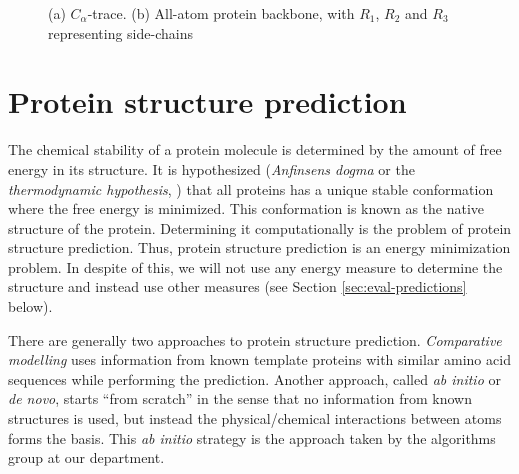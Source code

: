 

\begin{figure}
  \centering
  \caption{(a) $C_{\alpha}$-trace. (b) All-atom protein backbone, with $R_1$, $R_2$ and $R_3$ representing side-chains}
\end{figure}

\section{Protein structure prediction}
The chemical stability of a protein molecule is determined by the
amount of free energy in its structure. It is hypothesized
(\textit{Anfinsens dogma} or the \textit{thermodynamic hypothesis},
\cite{anfinsen73, soundararajan2010}) that all proteins has a unique
stable conformation where the free energy is minimized. This
conformation is known as the native structure of the
protein. Determining it computationally is the problem of protein
structure prediction. Thus, protein structure prediction is an energy
minimization problem. In despite of this, we will not use any energy
measure to determine the structure and instead use other measures (see
Section \ref{sec:eval-predictions} below).


There are generally two approaches to protein structure prediction.
\textit{Comparative modelling} uses information from known template
proteins with similar amino acid sequences while performing the
prediction. Another approach, called \textit{ab initio} or
\textit{de novo}, starts ``from scratch'' in the sense that no
information from known structures is used, but instead the
physical/chemical interactions between atoms forms the basis. This
\textit{ab initio} strategy is the approach taken by the algorithms
group at our department.

